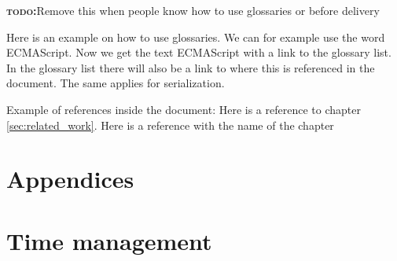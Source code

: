 \documentclass[BSP,english,oneside]{classes/gucthesis}
\newcommand{\comment}[1]{\textcolor{blue}{\emph{#1}}}
\newcommand{\todo}[1]{{\par\noindent\textbf{\textsc{\color{Gray}todo:}}\color{green}#1}}
\begin{document}
\todo{Remove this when people know how to use glossaries or before delivery}
Here is an example on how to use glossaries. We can for example use the word
\gls{ECMAScript}. Now we get the text ECMAScript with a link to the glossary
list. In the glossary list there will also be a link to where this is 
referenced in the document. The same applies for \gls{serialization}.

Example of references inside the document:
	Here is a reference to chapter \ref{sec:related_work}.
	Here is a reference with the name of the chapter 



\chapter{Appendices}

\appendix %




\printnoidxglossary[sort=word]

\chapter{Time management}
	\label{appx:time_management}
	




% 

% 

% 


\end{document}
